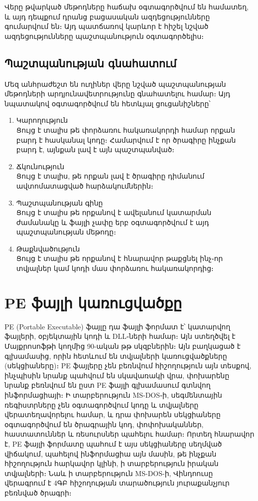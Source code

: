 \documentclass[12pt]{article}
\begin{document}
\begin{sloppypar}
Վերը թվարկած մեթոդները հաճախ օգտագործվում են համատեղ, և այդ դեպքում
դրանց բացասական ազդեցությունները գումարվում են։ Այդ պատճառով կարևոր է
հիշել նշված ազդեցությունները պաշտպանություն օգտագործելիս։

\subsection{Պաշտպանության գնահատում}
Մեզ անհրաժեշտ են ուղիներ վերը նշված պաշտպանության մեթոդների
արդյունավետրությունը գնահատելու համար։ Այդ նպատակով օգտագործվում են հետևյալ
ցուցանիշները՝
\begin{enumerate}
\item Կարողություն\\
	Ցույց է տալիս թե փորձառու հակառակորդի համար որքան բարդ է հասկանալ կոդը։
	Համարվում է որ ծրագիրը ինչքան բարդ է, այնքան լավ է այն պաշտպանված։
\item Ճկունություն\\
    Ցույց է տալիս, թե որքան լավ է ծրագիրը դիմանում ավտոմատացված հարձակումներին։
\item Պաշտպանության գինը\\
	Ցույց է տալիս թե որքանով է ավելանում կատարման ժամանակը և ֆայլի չափը երբ
	օգտագործվում է այդ պաշտպանության մեթոդը։
\item Թաքնվածություն\\
	Ցույց է տալիս թե որքանով է հնարավոր թաքցնել ինչ֊որ տվյալներ կամ կոդի մաս
	փորձառու հակառակորդից։
\end{enumerate}

\section{PE ֆայլի կառուցվածքը}
PE (Portable Executable) ֆայլը դա ֆայլի ֆորմատ է՝ կատարվող ֆայլերի, օբյեկտային
կոդի և DLL֊ների համար։ Այն ստեղծվել է Մայքրոսոֆթի կողմից 90-ական թթ սկզբներին։
Այն բաղկացած է գլխամասից, որին հետևում են տվյալների կառուցվածքները
(սեկցիաները)։ PE ֆայլերը չեն բեռնվում հիշողություն այն տեսքով, ինչպիսին նրանք
պահվում են սկավառակի վրա, փոխարենը նրանք բեռնվում են ըստ PE ֆայլի գլխամասում
գտնվող ինֆորմացիայի։ Ի տարբերություն MS-DOS֊ի, սեգմենտային ռեգիստրները չեն
օգտագործվում կոդը և տվյալները վերատեղավորելու համար, և դրա փոխարեն սեկցիաները
օգտագործվում են ծրագրային կոդ, փոփոխականներ, հաստատուններ և ռեսուրսներ պահելու
համար։ Որտեղ հնարավոր է, PE ֆայլի ֆորմատը պահում է այս սեկցիաները սեղմված
վիճակում, պահելով ինֆորմացիա այն մասին, թե ինչքան հիշողություն հարկավոր կլինի,
ի տարբերություն իրական տվյալների։ Նաև ի տարբերություն MS-DOS-ի, Վինդոուսը
վերագրում է 4ԳԲ հիշողության տարածություն յուրաքանչյուր բեռնված ծրագրի։


\end{sloppypar}
\end{document}
